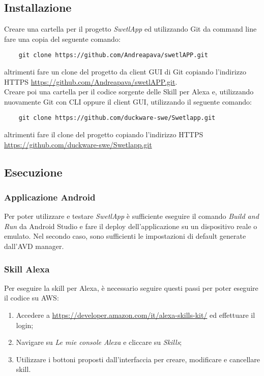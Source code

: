 \subsection{Installazione}
Creare una cartella per il progetto \textit{SwetlApp} ed utilizzando Git da command line fare una copia del seguente comando:
\begin{verbatim}
    git clone https://github.com/Andreapava/swetlAPP.git
\end{verbatim}
altrimenti fare un clone del progetto da client GUI di Git copiando l'indirizzo HTTPS \href{https://github.com/Andreapava/swetlAPP.git}{https://github.com/Andreapava/swetlAPP.git}.\\Creare poi una cartella per il codice sorgente delle Skill per Alexa e, utilizzando nuovamente Git con CLI oppure il client GUI, utilizzando il seguente comando:
\begin{verbatim}
    git clone https://github.com/duckware-swe/Swetlapp.git
\end{verbatim}
altrimenti fare il clone del progetto copiando l'indirizzo HTTPS \href{https://github.com/duckware-swe/Swetlapp.git}{https://github.com/duckware-swe/Swetlapp.git}

\subsection{Esecuzione}
\subsubsection{Applicazione Android}
Per poter utilizzare e testare \textit{SwetlApp} è sufficiente eseguire il comando \emph{Build and Run} da Android Studio e fare il deploy dell'applicazione su un dispositivo reale o emulato. Nel secondo caso, sono sufficienti le impostazioni di default generate dall'AVD manager.
\subsubsection{Skill Alexa}
Per eseguire la \Gls{skill} per \Gls{Alexa}, è necessario seguire questi passi per poter eseguire il codice su AWS:
\begin{enumerate}
    \item Accedere a \url{https://developer.amazon.com/it/alexa-skills-kit/} ed effettuare il login;
    \item Navigare su \emph{Le mie console Alexa} e cliccare su \emph{Skills};
    \item Utilizzare i bottoni proposti dall'interfaccia per creare, modificare e cancellare skill.
\end{enumerate}